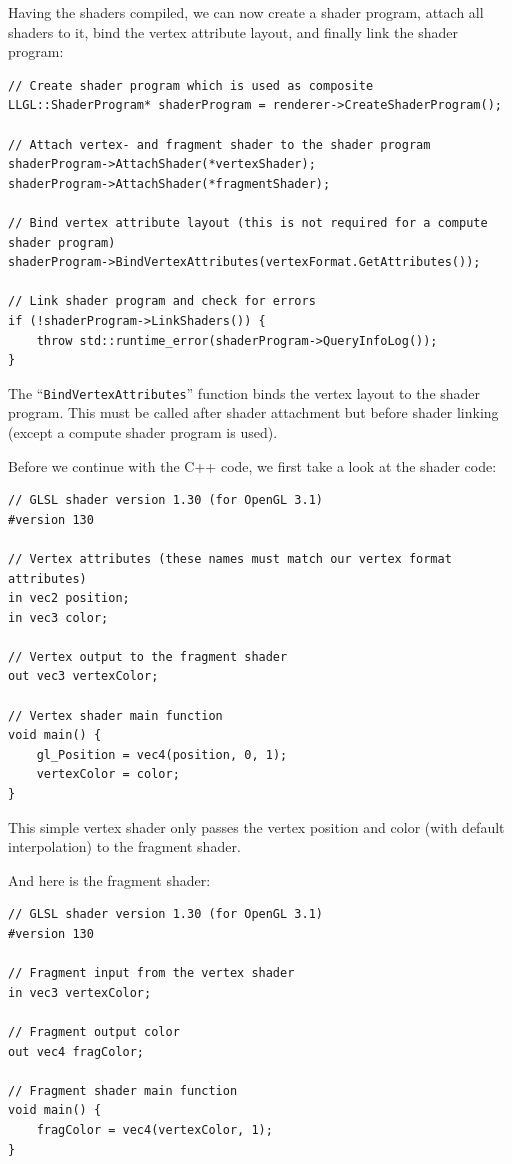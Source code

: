 \documentclass{article}
\begin{document}
Having the shaders compiled, we can now create a shader program, attach all shaders to it,
bind the vertex attribute layout, and finally link the shader program:
\begin{lstlisting}
// Create shader program which is used as composite
LLGL::ShaderProgram* shaderProgram = renderer->CreateShaderProgram();

// Attach vertex- and fragment shader to the shader program
shaderProgram->AttachShader(*vertexShader);
shaderProgram->AttachShader(*fragmentShader);

// Bind vertex attribute layout (this is not required for a compute shader program)
shaderProgram->BindVertexAttributes(vertexFormat.GetAttributes());

// Link shader program and check for errors
if (!shaderProgram->LinkShaders()) {
    throw std::runtime_error(shaderProgram->QueryInfoLog());
}
\end{lstlisting}
The ``\texttt{BindVertexAttributes}'' function binds the vertex layout to the shader program.
This must be called after shader attachment but before shader linking (except a compute shader program is used).

Before we continue with the C++ code, we first take a look at the shader code:
\begin{lstlisting}[title={\texttt{vertex.glsl}}]
// GLSL shader version 1.30 (for OpenGL 3.1)
#version 130

// Vertex attributes (these names must match our vertex format attributes)
in vec2 position;
in vec3 color;

// Vertex output to the fragment shader
out vec3 vertexColor;

// Vertex shader main function
void main() {
    gl_Position = vec4(position, 0, 1);
    vertexColor = color;
}
\end{lstlisting}
This simple vertex shader only passes the vertex position and color (with default interpolation) to the fragment shader.

\newpage
\noindent
And here is the fragment shader:
\begin{lstlisting}[title={\texttt{fragment.glsl}}]
// GLSL shader version 1.30 (for OpenGL 3.1)
#version 130

// Fragment input from the vertex shader
in vec3 vertexColor;

// Fragment output color
out vec4 fragColor;

// Fragment shader main function
void main() {
    fragColor = vec4(vertexColor, 1);
}
\end{lstlisting}
\end{document}
